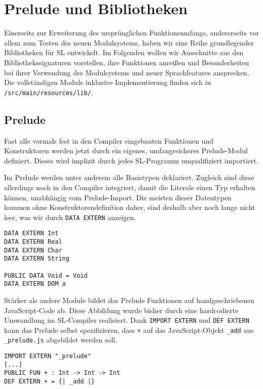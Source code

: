 \documentclass[runningheads]{llncs}
\begin{document}
\section{Prelude und Bibliotheken}
\label{sec:libs}

Einerseits zur Erweiterung des ursprünglichen Funktionsumfangs, andererseits
vor allem zum Testen des neuen Modulsystems, haben wir eine Reihe grundlegender
Bibliotheken für SL entwickelt. Im Folgenden wollen wir Ausschnitte aus den
Bibliothekssignaturen vorstellen, ihre Funktionen anreißen und
Besonderheiten bei ihrer Verwendung des Modulsystems und neuer Sprachfeatures
ansprechen. Die vollständigen Module inklusive Implementierung finden sich
in \verb|/src/main/resources/lib/|.

\subsection{Prelude}
\label{sec:libsPrelude}

Fast alle vormals fest in den Compiler eingebauten Funktionen und Konstruktoren
werden jetzt durch ein eigenes, umfangreicheres Prelude-Modul definiert.
Dieses wird implizit durch jedes SL-Programm unqualifiziert importiert.

Im Prelude werden unter anderem alle Basistypen deklariert. Zugleich sind
diese allerdings noch in den Compiler integriert, damit die Literale einen
Typ erhalten können, unabhängig vom Prelude-Import. Die meisten dieser
Datentypen kommen ohne Konstruktorendefinition daher, sind deshalb aber noch
lange nicht leer, was wir durch \verb|DATA EXTERN| anzeigen.

\begin{verbatim}
DATA EXTERN Int
DATA EXTERN Real
DATA EXTERN Char
DATA EXTERN String

PUBLIC DATA Void = Void
DATA EXTERN DOM a
\end{verbatim}

Stärker als andere Module bildet das Prelude Funktionen auf handgeschriebenen
JavaScript-Code ab. Diese Abbildung wurde bisher durch eine hardcodierte
Umwandlung im SL-Compiler realisiert. Dank \verb|IMPORT EXTERN| und
\verb|DEF EXTERN| kann das Prelude selbst spezifizieren, dass \verb|+| auf das
JavaScript-Objekt \verb|_add| aus \verb|_prelude.js| abgebildet werden soll.

\begin{verbatim}
IMPORT EXTERN "_prelude" 
[...]
PUBLIC FUN + : Int -> Int -> Int
DEF EXTERN + = {| _add |}
\end{verbatim}
\end{document}
